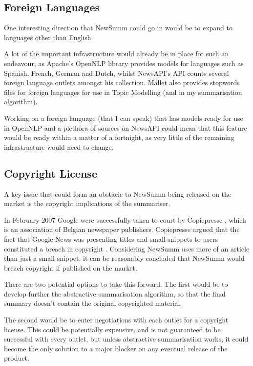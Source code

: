 \documentclass[12pt]{article}
\begin{document}
\subsection{Foreign Languages}

One interesting direction that NewSumm could go in would be to expand to languages other than English. 

A lot of the important infrastructure would already be in place for such an endeavour, as Apache's OpenNLP \cite{opennlp} library provides models for languages such as Spanish, French, German and Dutch, whilst NewsAPI's API \cite{newsApi} counts several foreign language outlets amongst his collection. Mallet \cite{mallet} also provides stopwords files for foreign languages for use in Topic Modelling (and in my summarisation algorithm).

Working on a foreign language (that I can speak) that has models ready for use in OpenNLP and a plethora of sources on NewsAPI could mean that this feature would be ready within a matter of a fortnight, as very little of the remaining infrastructure would need to change.

\subsection{Copyright License}

A key issue that could form an obstacle to NewSumm being released on the market is the copyright implications of the summariser. 

In February 2007 Google \cite{google} were successfully taken to court by Copiepresse \cite{copiepresse}, which is an association of Belgian newspaper publishers. Copiepresse argued that the fact that Google News \cite{googleNews} was presenting titles and small snippets to users constituted a breach in copyright \cite{copiepressearticle}. Considering NewSumm uses more of an article than just a small snippet, it can be reasonably concluded that NewSumm would breach copyright if published on the market.

There are two potential options to take this forward. The first would be to develop further the abstractive summarisation algorithm, so that the final summary doesn't contain the original copyrighted material.

The second would be to enter negotiations with each outlet for a copyright license. This could be potentially expensive, and is not guaranteed to be successful with every outlet, but unless abstractive summarisation works, it could become the only solution to a major blocker on any eventual release of the product. 
\end{document}
